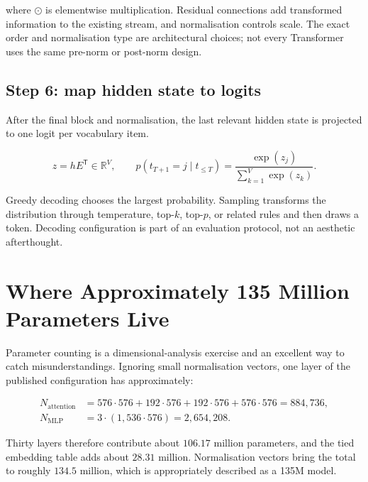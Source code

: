 where $\odot$ is elementwise multiplication.
Residual connections add transformed information to the existing stream, and
normalisation controls scale.
The exact order and normalisation type are architectural choices; not every
Transformer uses the same pre-norm or post-norm design.

\subsection{Step 6: map hidden state to logits}

After the final block and normalisation, the last relevant hidden state is
projected to one logit per vocabulary item.

\begin{equation}
    z = hE^{\mathsf T}\in\mathbb{R}^{V},
    \qquad
    p(t_{T+1}=j\mid t_{\leq T})=
    \frac{\exp(z_j)}{\sum_{k=1}^{V}\exp(z_k)}.
    \label{eq:next-token-softmax}
\end{equation}

Greedy decoding chooses the largest probability.
Sampling transforms the distribution through temperature, top-$k$, top-$p$,
or related rules and then draws a token.
Decoding configuration is part of an evaluation protocol, not an aesthetic
afterthought.

\section{Where Approximately 135 Million Parameters Live}

Parameter counting is a dimensional-analysis exercise and an excellent way to
catch misunderstandings.
Ignoring small normalisation vectors, one layer of the published configuration
has approximately:

\begin{align}
    N_{\mathrm{attention}}
    &= 576\cdot576
      + 192\cdot576
      + 192\cdot576
      + 576\cdot576
      = 884{,}736,
      \label{eq:smollm-attention-parameters}\\
    N_{\mathrm{MLP}}
    &= 3\cdot(1{,}536\cdot576)
      = 2{,}654{,}208.
      \label{eq:smollm-mlp-parameters}
\end{align}

Thirty layers therefore contribute about $106.17$ million parameters, and the
tied embedding table adds about $28.31$ million.
Normalisation vectors bring the total to roughly $134.5$ million, which is
appropriately described as a 135M model.

